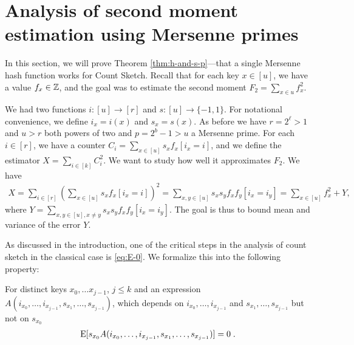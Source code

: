 

\section{Analysis of second moment estimation using Mersenne primes}
\label{sec:analysis-two-for-one}
In this section, we will prove Theorem \ref{thm:h-and-s-p}---that a single Mersenne hash function works for Count Sketch.
Recall that for each key $x\in [u]$, we have a value $f_x\in \mathbb Z$, and the
goal was to estimate the second moment $F_2 = \sum_{x\in u}f_x^2$.

We had two functions $i:[u]\to[r]$ and $s:[u]\to\{-1,1\}$. 
For notational convenience, we define $i_x=i(x)$ and $s_x=s(x)$.
As before we have $r=2^\ell>1$ and $u>r$ both powers of two and $p=2^b-1>u$ a Mersenne prime.
For each $i\in [r]$, we have a counter 
$C_i=\sum_{x\in[u]} s_x f_x[i_x=i]$, and we define the 
estimator $X=\sum_{i\in[k]} C_i^2$. We want to study how
well it approximates $F_2$.
We have 
\begin{align}
X=\sum_{i\in[r]}\left( \sum_{x\in[u]}s_x f_x[i_x=i]\right)^2
=\sum_{x,y\in[u]}s_x s_y f_x f_y[i_x=i_y]
=\sum_{x\in[u]} f_x^2+Y,
\label{eq:decomp}
\end{align}
where $Y=\sum_{x,y\in[u],x\neq y} s_x s_y f_x f_y [i_x = i_y]$.
The goal is thus to bound mean and variance of the error $Y$.

As discussed in the introduction, one of the critical steps in the analysis of count sketch in the classical case is \cref{eq:E-0}.
We formalize this into the following property:
\begin{property}\label{prop:independence}
    For distinct keys $x_0, \ldots x_{j - 1}$, $j \le k$
    and an expression $A(i_{x_0}, \ldots, i_{x_{j - 1}}, s_{x_1}, \ldots, s_{x_{j - 1}})$,
    which depends on $i_{x_0}, \ldots, i_{x_{j - 1}}$ and $s_{x_1}, \ldots, s_{x_{j - 1}}$
    but not on $s_{x_0}$
    \begin{align}
        \operatorname*{E}[s_{x_0} A(i_{x_0}, \ldots, i_{x_{j - 1}}, s_{x_1}, \ldots, s_{x_{j - 1}})] = 0\; .
    \end{align}
\end{property}

